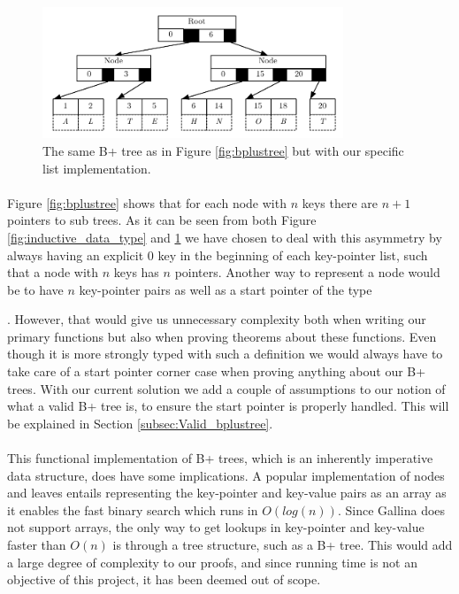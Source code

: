 \begin{figure}
 \centering
   \includegraphics[width=90mm]{diagrams/BPlusTreeImpl.pdf}
 \caption{The same B+ tree as in Figure \ref{fig:bplustree} but with our specific list implementation.}
 \label{fig:bplustreeImpl}
\end{figure}

\paragraph{}
Figure \ref{fig:bplustree} shows that for each node with $n$ keys there are $n+1$ pointers to sub trees. As it can be seen from both Figure \ref{fig:inductive_data_type} and \ref{fig:bplustreeImpl} we have chosen to deal with this asymmetry by always having an explicit $0$ key in the beginning of each key-pointer list, such that a node with $n$ keys has $n$ pointers. Another way to represent a node would be to have $n$ key-pointer pairs as well as a start pointer of the type \begin{coqdoccode}  \end{coqdoccode}. However, that would give us unnecessary complexity both when writing our primary functions but also when proving theorems about these functions. Even though it is more strongly typed with such a definition we would always have to take care of a start pointer corner case when proving anything about our B+ trees. With our current solution we add a couple of assumptions to our notion of what a valid B+ tree is, to ensure the start pointer is properly handled. This will be explained in Section \ref{subsec:Valid_bplustree}. 

\paragraph{}
This functional implementation of B+ trees, which is an inherently imperative data structure, does have some implications. A popular implementation of nodes and leaves entails representing the key-pointer and key-value pairs as an array as it enables the fast binary search which runs in $O(log(n))$. Since Gallina does not support arrays, the only way to get lookups in key-pointer and key-value faster than $O(n)$ is through a tree structure, such as a B+ tree. This would add a large degree of complexity to our proofs, and since running time is not an objective of this project, it has been deemed out of scope.

